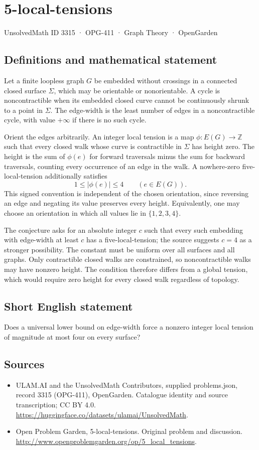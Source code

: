 \documentclass[11pt,a4paper]{article}
\begin{document}
\section*{5-local-tensions}\label{3315}
{\small UnsolvedMath ID 3315 · OPG-411 · Graph Theory · OpenGarden}
\subsection{Definitions and mathematical statement}
Let a finite loopless graph $G$ be embedded without crossings in a connected closed surface $\Sigma$, which may be orientable or nonorientable. A cycle is noncontractible when its embedded closed curve cannot be continuously shrunk to a point in $\Sigma$. The edge-width is the least number of edges in a noncontractible cycle, with value $+\infty$ if there is no such cycle.

Orient the edges arbitrarily. An integer local tension is a map $\phi:E(G)\to\mathbb Z$ such that every closed walk whose curve is contractible in $\Sigma$ has height zero. The height is the sum of $\phi(e)$ for forward traversals minus the sum for backward traversals, counting every occurrence of an edge in the walk. A nowhere-zero five-local-tension additionally satisfies
\[
                      1\le|\phi(e)|\le4\qquad(e\in E(G)).
\]
This signed convention is independent of the chosen orientation, since reversing an edge and negating its value preserves every height. Equivalently, one may choose an orientation in which all values lie in $\{1,2,3,4\}$.

The conjecture asks for an absolute integer $c$ such that every such embedding with edge-width at least $c$ has a five-local-tension; the source suggests $c=4$ as a stronger possibility. The constant must be uniform over all surfaces and all graphs. Only contractible closed walks are constrained, so noncontractible walks may have nonzero height. The condition therefore differs from a global tension, which would require zero height for every closed walk regardless of topology.
\subsection{Short English statement}
Does a universal lower bound on edge-width force a nonzero integer local tension of magnitude at most four on every surface?
\subsection{Sources}
\begin{itemize}
\item[S1] ULAM.AI and the UnsolvedMath Contributors, supplied problems.json, record 3315 (OPG-411), OpenGarden. Catalogue identity and source transcription; CC BY 4.0.
\url{https://huggingface.co/datasets/ulamai/UnsolvedMath}.
\item[S2] Open Problem Garden, 5-local-tensions. Original problem and discussion.
\url{http://www.openproblemgarden.org/op/5_local_tensions}.
\end{itemize}
\end{document}
